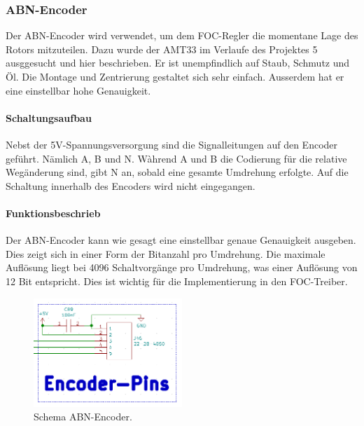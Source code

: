 \subsubsection{ABN-Encoder}
\label{subsubsec:ABN-Encoder}

Der ABN-Encoder wird verwendet, um dem FOC-Regler die momentane Lage des Rotors mitzuteilen. Dazu wurde der AMT33 im Verlaufe des Projektes 5 ausggesucht und hier beschrieben. Er ist unempfindlich auf Staub, Schmutz und Öl. Die Montage und Zentrierung gestaltet sich sehr einfach. Ausserdem hat er eine einstellbar hohe Genauigkeit.

\paragraph{Schaltungsaufbau}\mbox{}

Nebst der 5V-Spannungsversorgung sind die Signalleitungen auf den Encoder geführt. Nämlich A, B und N. Wàhrend A und B die Codierung für die relative Wegänderung sind, gibt N an, sobald eine gesamte Umdrehung erfolgte. Auf die Schaltung innerhalb des Encoders wird nicht eingegangen.

\paragraph{Funktionsbeschrieb}\mbox{}

Der ABN-Encoder kann wie gesagt eine einstellbar genaue Genauigkeit ausgeben. Dies zeigt sich in einer Form der Bitanzahl pro Umdrehung. Die maximale Auflösung liegt bei 4096 Schaltvorgänge pro Umdrehung, was einer Auflösung von 12 Bit entspricht. Dies ist wichtig für die Implementierung in den FOC-Treiber.

\begin{figure}[h!]
	\centering
	\includegraphics[width=0.5\textwidth]{graphics/Schema_ABN_Encoder}
	\caption{Schema ABN-Encoder.}
	\label{fig:Schema_ABN_Encoder}
\end{figure} 
